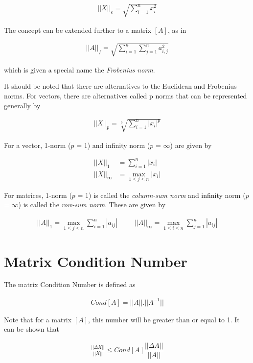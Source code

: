 \documentclass[book.tex]{subfiles}
\begin{document}
\begin{align}
	||X||_e = \sqrt{\sum_{i=1}^n x_i^2} 
\end{align}

The concept can be extended further to a matrix $[A]$, as in

\begin{align}
||A||_f = \sqrt{\sum_{i=1}^n \sum_{j=1}^n a_{i,j}^2}
\end{align}

which is given a special name the \textit{Frobenius norm}.

It should be noted that there are alternatives to the Euclidean and Frobenius norms. For
vectors, there are alternatives called p norms that can be represented generally by

\begin{align}
||X||_p = \sqrt[p]{\sum_{i=1}^n |x_i|^p} 
\end{align}

For a vector, 1-norm ($p$ = 1) and infinity norm ($p$ = $\infty$) are given by

\begin{align}
||X||_1 &= \sum_{i=1}^n |x_i| \\
||X||_\infty &= \max_{1 \leq j \leq n} |x_i| 
\end{align}

For matrices, 1-norm ($p$ = 1) is called the \textit{column-sum norm} and infinity norm ($p$ = $\infty$) is called the \textit{row-sum norm}. These are given by

\begin{align}
||A||_1 = \max_{1\leq j\leq n }\sum_{i=1}^n |a_{ij}|  \hspace{30pt} ||A||_\infty = \max_{1\leq i\leq n }\sum_{j=1}^n |a_{ij}|  
\end{align}

\section{Matrix Condition Number}

The matrix Condition Number is defined as 

\begin{align}
Cond[A] = ||A||.||A^{-1}||
\end{align}

Note that for a matrix $[A]$, this number will be greater than or equal to 1. It can be shown that

\begin{align}
\frac{||\Delta X||}{||X||} \leqslant Cond[A]\dfrac{||\Delta A||}{||A||}
\end{align}
\end{document}
